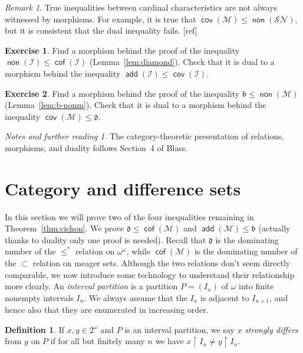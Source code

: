 \documentclass[11pt,oneside]{amsbook}
\newcommand{\Meager}{\mathcal M}
\DeclareMathOperator{\add}{\mathsf{add}}
\DeclareMathOperator{\non}{\mathsf{non}}
\DeclareMathOperator{\cov}{\mathsf{cov}}
\DeclareMathOperator{\cof}{\mathsf{cof}}
\theoremstyle{definition}
\newtheorem{exerc}{Exercise}[section]
\theoremstyle{plain}
\theoremstyle{definition}
\newtheorem{defn}[thm]{Definition}
\theoremstyle{remark}
\newtheorem{rem}[thm]{Remark}
\newtheorem*{notes}{Notes and further reading}
\numberwithin{equation}{section}
\numberwithin{figure}{section}
\begin{document}
\begin{rem}
  True inequalities between cardinal characteristics are not always witnessed by morphisms. For example, it is true that $\cov(\Meager)\leq\non(\mathcal{SN})$, but it is consistent that the dual inequality fails. [ref]
\end{rem}

\begin{exerc}
  Find a morphism behind the proof of the inequality $\non(\mathcal I)\leq\cof(\mathcal I)$ (Lemma~\ref{lem:diamond}). Check that it is dual to a morphism behind the inequality $\add(\mathcal I)\leq\cov(\mathcal I)$.
\end{exerc}

\begin{exerc}
  Find a morphism behind the proof of the inequality $\mathfrak b\leq\non(\Meager)$ (Lemma~\ref{lem:b-nonm}). Check that it is dual to a morphism behind the inequality $\cov(\Meager)\leq\mathfrak d$.
\end{exerc}

\begin{notes}
  The category-theoretic presentation of relations, morphisms, and duality follows Section~4 of Blass.
\end{notes}


\section{Category and difference sets}

In this section we will prove two of the four inequalities remaining in Theorem~\ref{thm:cichon}. We prove $\mathfrak d\leq\cof(\Meager)$ and $\add(\Meager)\leq\mathfrak b$ (actually thanks to duality only one proof is needed). Recall that $\mathfrak d$ is the dominating number of the $\leq^*$ relation on $\omega^\omega$, while $\cof(\Meager)$ is the dominating number of the $\subset$ relation on meager sets. Although the two relations don't seem directly comparable, we now introduce some technology to understand their relationship more clearly. An \emph{interval partition} is a partition $P=(I_n)$ of $\omega$ into finite nonempty intervals $I_n$. We always assume that the $I_n$ is adjacent to $I_{n+1}$, and hence also that they are enumerated in increasing order.

\begin{defn}
  If $x,y\in2^\omega$ and $P$ is an interval partition, we say $x$ \emph{strongly differs} from $y$ on $P$ if for all but finitely many $n$ we have $x\restriction I_n\neq y\restriction I_n$.
\end{defn}
\end{document}
